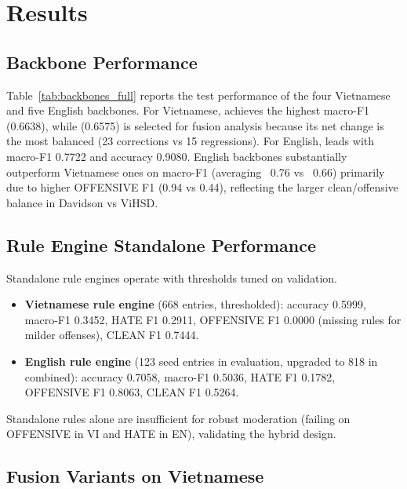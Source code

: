 \section{Results}
\label{sec:results}

\subsection{Backbone Performance}
\label{sec:results_backbones}

Table~\ref{tab:backbones_full} reports the test performance of the four
Vietnamese and five English backbones.  For Vietnamese,
 achieves the highest macro-F1 (0.6638), while
 (0.6575) is selected for fusion analysis because
its net change is the most balanced (23 corrections vs 15 regressions).  For
English,  leads with macro-F1 0.7722 and accuracy
0.9080.  English backbones substantially outperform Vietnamese ones on macro-F1
(averaging ~0.76 vs ~0.66) primarily due to higher OFFENSIVE F1 (0.94 vs 0.44),
reflecting the larger clean/offensive balance in Davidson vs ViHSD.

\subsection{Rule Engine Standalone Performance}
\label{sec:results_rule}

Standalone rule engines operate with thresholds tuned on validation.
\begin{itemize}
    \item \textbf{Vietnamese rule engine} (668 entries, thresholded): accuracy
          0.5999, macro-F1 0.3452, HATE F1 0.2911, OFFENSIVE F1 0.0000 (missing
          rules for milder offenses), CLEAN F1 0.7444.
    \item \textbf{English rule engine} (123 seed entries in evaluation,
          upgraded to 818 in combined): accuracy 0.7058, macro-F1 0.5036,
          HATE F1 0.1782, OFFENSIVE F1 0.8063, CLEAN F1 0.5264.
\end{itemize}
Standalone rules alone are insufficient for robust moderation (failing on
OFFENSIVE in VI and HATE in EN), validating the hybrid design.

\subsection{Fusion Variants on Vietnamese}
\label{sec:results_fusion}

